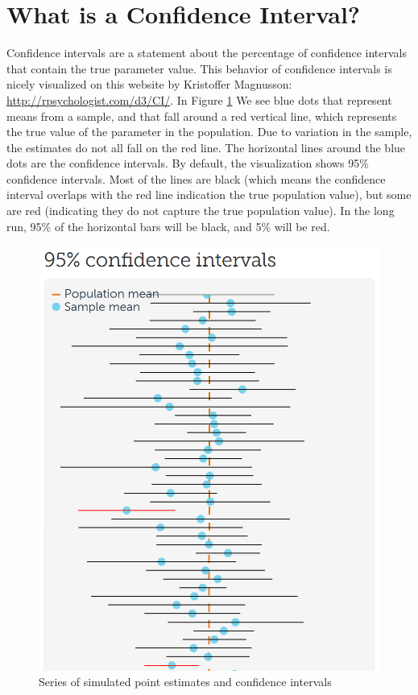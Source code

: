 \documentclass[
]{krantz}
\begin{document}
\hypertarget{what-is-a-confidence-interval}{%
\section{What is a Confidence Interval?}\label{what-is-a-confidence-interval}}

Confidence intervals are a statement about the percentage of confidence intervals that contain the true parameter value. This behavior of confidence intervals is nicely visualized on this website by Kristoffer Magnusson: \url{http://rpsychologist.com/d3/CI/}. In Figure \ref{fig:cisim} We see blue dots that represent means from a sample, and that fall around a red vertical line, which represents the true value of the parameter in the population. Due to variation in the sample, the estimates do not all fall on the red line. The horizontal lines around the blue dots are the confidence intervals. By default, the visualization shows 95\% confidence intervals. Most of the lines are black (which means the confidence interval overlaps with the red line indication the true population value), but some are red (indicating they do not capture the true population value). In the long run, 95\% of the horizontal bars will be black, and 5\% will be red.

\begin{figure}

{\centering \includegraphics[width=1\linewidth]{images/cisim} 

}

\caption{Series of simulated point estimates and confidence intervals}\label{fig:cisim}
\end{figure}
\end{document}
